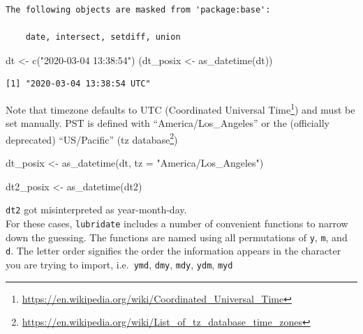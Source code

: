 \documentclass[
]{book}
\newenvironment{Shaded}{\begin{snugshade}}{\end{snugshade}}
\newcommand{\AttributeTok}[1]{\textcolor[rgb]{0.77,0.63,0.00}{#1}}
\newcommand{\FunctionTok}[1]{\textcolor[rgb]{0.00,0.00,0.00}{#1}}
\newcommand{\NormalTok}[1]{#1}
\newcommand{\OtherTok}[1]{\textcolor[rgb]{0.56,0.35,0.01}{#1}}
\newcommand{\StringTok}[1]{\textcolor[rgb]{0.31,0.60,0.02}{#1}}
\renewcommand{\href}[2]{#2\footnote{\url{#1}}}
\begin{document}
\begin{verbatim}
The following objects are masked from 'package:base':

    date, intersect, setdiff, union
\end{verbatim}

\begin{Shaded}
\begin{Highlighting}[]
\NormalTok{dt }\OtherTok{\textless{}{-}} \FunctionTok{c}\NormalTok{(}\StringTok{"2020{-}03{-}04 13:38:54"}\NormalTok{)}
\NormalTok{(dt\_posix }\OtherTok{\textless{}{-}} \FunctionTok{as\_datetime}\NormalTok{(dt))}
\end{Highlighting}
\end{Shaded}

\begin{verbatim}
[1] "2020-03-04 13:38:54 UTC"
\end{verbatim}

Note that timezone defaults to UTC (\href{https://en.wikipedia.org/wiki/Coordinated_Universal_Time}{Coordinated Universal Time}) and must be set manually. PST is defined with ``America/Los\_Angeles'' or the (officially deprecated) ``US/Pacific'' (\href{https://en.wikipedia.org/wiki/List_of_tz_database_time_zones}{tz database})

\begin{Shaded}
\begin{Highlighting}[]
\NormalTok{dt\_posix }\OtherTok{\textless{}{-}} \FunctionTok{as\_datetime}\NormalTok{(dt, }\AttributeTok{tz =} \StringTok{"America/Los\_Angeles"}\NormalTok{)}
\end{Highlighting}
\end{Shaded}

\begin{Shaded}
\begin{Highlighting}[]
\NormalTok{dt2\_posix }\OtherTok{\textless{}{-}} \FunctionTok{as\_datetime}\NormalTok{(dt2)}
\end{Highlighting}
\end{Shaded}

\texttt{dt2} got misinterpreted as year-month-day.\\
For these cases, \texttt{lubridate} includes a number of convenient functions to narrow down the guessing. The functions are named using all permutations of \texttt{y}, \texttt{m}, and \texttt{d}. The letter order signifies the order the information appears in the character you are trying to import, i.e.~\texttt{ymd}, \texttt{dmy}, \texttt{mdy}, \texttt{ydm}, \texttt{myd}
\end{document}
